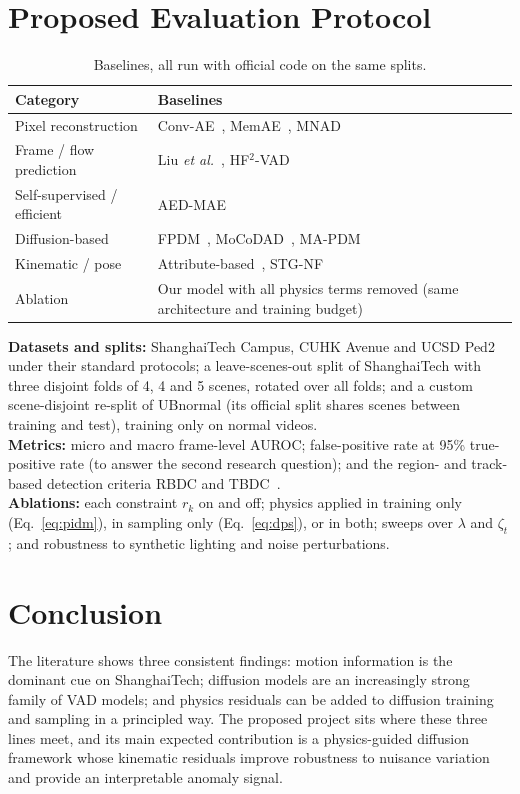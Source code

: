 \documentclass[11pt,a4paper]{article}
\begin{document}
\section{Proposed Evaluation Protocol}
\begin{table}[h]
\centering
\small
\begin{tabularx}{\linewidth}{@{}lX@{}}
\toprule
\textbf{Category} & \textbf{Baselines} \\
\midrule
Pixel reconstruction & Conv-AE~\cite{hasan2016learning}, MemAE~\cite{gong2019memorizing}, MNAD~\cite{park2020learning} \\
Frame / flow prediction & Liu \emph{et al.}~\cite{liu2018future}, HF$^2$-VAD~\cite{liu2021hybrid} \\
Self-supervised / efficient & AED-MAE~\cite{ristea2024selfdistilled} \\
Diffusion-based & FPDM~\cite{yan2023feature}, MoCoDAD~\cite{flaborea2023multimodal}, MA-PDM~\cite{zhou2025video} \\
Kinematic / pose & Attribute-based~\cite{reiss2022attribute}, STG-NF~\cite{hirschorn2023normalizing} \\
Ablation & Our model with all physics terms removed (same architecture and training budget) \\
\bottomrule
\end{tabularx}
\caption{Baselines, all run with official code on the same splits.}
\end{table}

\noindent\textbf{Datasets and splits:} ShanghaiTech Campus, CUHK Avenue and UCSD Ped2 under their standard protocols; a leave-scenes-out split of ShanghaiTech with three disjoint folds of 4, 4 and 5 scenes, rotated over all folds; and a custom scene-disjoint re-split of UBnormal (its official split shares scenes between training and test), training only on normal videos.\\
\textbf{Metrics:} micro and macro frame-level AUROC; false-positive rate at 95\% true-positive rate (to answer the second research question); and the region- and track-based detection criteria RBDC and TBDC~\cite{ramachandra2020street}.\\
\textbf{Ablations:} each constraint $r_k$ on and off; physics applied in training only (Eq.~\ref{eq:pidm}), in sampling only (Eq.~\ref{eq:dps}), or in both; sweeps over $\lambda$ and $\zeta_t$; and robustness to synthetic lighting and noise perturbations.

\section{Conclusion}
The literature shows three consistent findings: motion information is the dominant cue on ShanghaiTech; diffusion models are an increasingly strong family of VAD models; and physics residuals can be added to diffusion training and sampling in a principled way. The proposed project sits where these three lines meet, and its main expected contribution is a physics-guided diffusion framework whose kinematic residuals improve robustness to nuisance variation and provide an interpretable anomaly signal.
\end{document}
